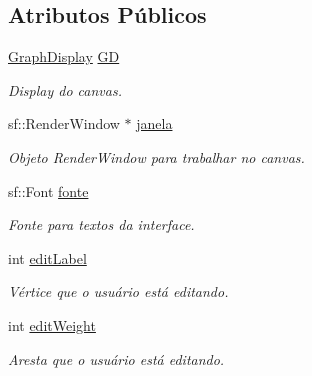 \subsection*{Atributos Públicos}
\begin{DoxyCompactItemize}
\item 
\mbox{\label{classGraphCanvas_a7e2f16ce3638db53fb73061fe1c93f15}} 
\hyperlink{classGraphDisplay}{Graph\+Display} \hyperlink{classGraphCanvas_a7e2f16ce3638db53fb73061fe1c93f15}{GD}
\begin{DoxyCompactList}\small\item\em Display do canvas. \end{DoxyCompactList}\item 
\mbox{\label{classGraphCanvas_acbae5a92eb6cdc7cd7714093295f5412}} 
sf\+::\+Render\+Window $\ast$ \hyperlink{classGraphCanvas_acbae5a92eb6cdc7cd7714093295f5412}{janela}
\begin{DoxyCompactList}\small\item\em Objeto Render\+Window para trabalhar no canvas. \end{DoxyCompactList}\item 
\mbox{\label{classGraphCanvas_a74e79b17a3bbfa10dfa1bbe9f1aeb47d}} 
sf\+::\+Font \hyperlink{classGraphCanvas_a74e79b17a3bbfa10dfa1bbe9f1aeb47d}{fonte}
\begin{DoxyCompactList}\small\item\em Fonte para textos da interface. \end{DoxyCompactList}\item 
\mbox{\label{classGraphCanvas_a65406a215bd30e44358031c5b8a2cc2b}} 
int \hyperlink{classGraphCanvas_a65406a215bd30e44358031c5b8a2cc2b}{edit\+Label}
\begin{DoxyCompactList}\small\item\em Vértice que o usuário está editando. \end{DoxyCompactList}\item 
\mbox{\label{classGraphCanvas_a3b81b5c942b2fe3d94952d7ce664d3ed}} 
int \hyperlink{classGraphCanvas_a3b81b5c942b2fe3d94952d7ce664d3ed}{edit\+Weight}
\begin{DoxyCompactList}\small\item\em Aresta que o usuário está editando. \end{DoxyCompactList}\end{DoxyCompactItemize}


